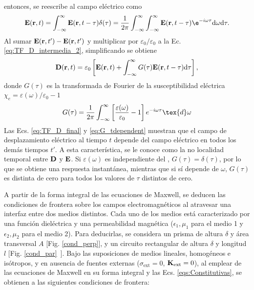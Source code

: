 entonces, se reescribe al campo eléctrico como
\begin{equation}
	\vb{E}(\vb{r},t)=\int_{-\infty}^{\infty}\vb{E}(\vb{r},t-\tau)\delta(\tau)=\frac{1}{2\pi}\int_{-\infty}^{\infty}\int_{-\infty}^{\infty}\vb{E}(\vb{r},t-\tau)\e^{-i\omega\tau}\text{d}\omega\text{d}\tau.
\end{equation}
%
Al sumar $\vb{E}(\vb{r},t')-\vb{E}(\vb{r},t')$ y multiplicar por $\varepsilon_0/\varepsilon_0$ a la Ec. \eqref{eq:TF_D_intermedia_2}, simplificando se obtiene
%
\begin{equation}
	\vb{D}(\vb{r},t)=\varepsilon_0\left[\vb{E}(\vb{r},t)+\int_{-\infty}^{\infty}G(\tau)\vb{E}(\vb{r},t-\tau)\text{d}\tau\right],\label{eq:TF_D_final}
\end{equation}
%
donde $G(\tau)$ es la transformada de Fourier de la susceptibilidad eléctrica $\chi_e=\varepsilon(\omega)/\varepsilon_0-1$
%
\begin{equation}
	G(\tau)=\frac{1}{2\pi}\int_{-\infty}^{\infty}\left[\frac{\varepsilon(\omega)}{\varepsilon_0}-1\right]e^{-i\omega\tau}\tex{d}\omega
	\label{eq:G_tdependent}
\end{equation}
%
Las Ecs. \eqref{eq:TF_D_final} y \eqref{eq:G_tdependent} muestran que el campo de desplazamiento eléctrico al tiempo $t$ depende del campo eléctrico en todos los demás tiempos $t'$. A esta característica, se le conoce como la no localidad temporal entre $\vb{D}$ y $\vb{E}$. Si $\varepsilon(\omega)$ es independiente del \omega, $G(\tau)=\delta(\tau)$, por lo que se obtiene una respuesta instantánea, mientras que si sí depende de $\omega$, $G(\tau)$ es distinta de cero para todos los valores de $\tau$ distintos de cero.





A partir de la forma integral de las ecuaciones de Maxwell, se deducen las condiciones de frontera sobre los campos electromagnéticos al atravesar una interfaz entre dos medios distintos. Cada uno de los medios está caracterizado por una función dieléctrica y una permeabilidad magnética ($\epsilon_1, \mu_1$ para el medio 1 y $\epsilon_2, \mu_2$ para el medio 2). Para deducirlas, se considera un prisma de altura $\delta$ y área transversal $A$ [Fig. \ref{cond_perp}], y un circuito rectangular de altura $\delta$ y longitud $l$ [Fig. \ref{cond_par} ]. Bajo las suposiciones de medios lineales, homogéneos e isótropos, y en ausencia de fuentes externas ($\sigma_{\text{ext}} = 0$, $\vb{K}_{\text{ext}} = 0$), al emplear de las ecuaciones de Maxwell en su forma integral y las Ecs. \eqref{eqs:Constitutivas}, se obtienen a las siguientes condiciones de frontera:


